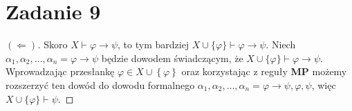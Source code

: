 \newpage

\section*{Zadanie 9}

\begin{proof}[\( (\Leftarrow) \)]
    Skoro \( X \vdash \varphi \to \psi \), to tym bardziej \( X \cup \{\varphi\} \vdash \varphi \to \psi \). Niech \( \alpha_1, \alpha_2, \ldots, \alpha_n = \varphi \to \psi \) będzie dowodem świadczącym, że \( X \cup \{ \varphi \} \vdash \varphi \to \psi \). Wprowadzając przesłankę \( \varphi \in X \cup \left\{ \varphi \right\} \) oraz korzystając z reguły \textbf{MP} możemy rozszerzyć ten dowód do dowodu formalnego \( \alpha_1, \alpha_2, \ldots, \alpha_n = \varphi \to \psi, \varphi, \psi \), więc \( X \cup \{\varphi\} \vdash \psi \).
\end{proof}

